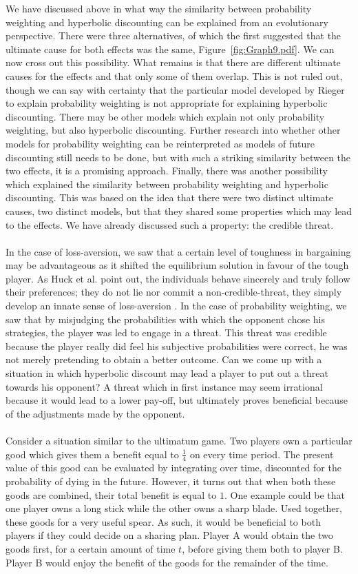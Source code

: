 \documentclass[a4paper,10pt]{article}
\numberwithin{equation}{section}
\begin{document}
We have discussed above in what way the similarity between probability weighting and hyperbolic discounting can be explained from an evolutionary perspective. There were three alternatives, of which the first suggested that the ultimate cause for both effects was the same, Figure~\ref{fig:Graph9.pdf}. We can now cross out this possibility. What remains is that there are different ultimate causes for the effects and that only some of them overlap. This is not ruled out, though we can say with certainty that the particular model developed by Rieger to explain probability weighting is not appropriate for explaining hyperbolic discounting. There may be other models which explain not only probability weighting, but also hyperbolic discounting. Further research into whether other models for probability weighting can be reinterpreted as models of future discounting still needs to be done, but with such a striking similarity between the two effects, it is a promising approach. Finally, there was another possibility which explained the similarity between probability weighting and hyperbolic discounting. This was based on the idea that there were two distinct ultimate causes, two distinct models, but that they shared some properties which may lead to the effects. We have already discussed such a property: the credible threat.\\
\\
In the case of loss-aversion, we saw that a certain level of toughness in bargaining may be advantageous as it shifted the equilibrium solution in favour of the tough player. As Huck et al. point out, the individuals behave sincerely and truly follow their preferences; they do not lie nor commit a non-credible-threat, they simply develop an innate sense of loss-aversion 
\cite{Huck2005}. In the case of probability weighting, we saw that by misjudging the probabilities with which the opponent chose his strategies, the player was led to engage in a threat. This threat was credible because the player really did feel his subjective probabilities were correct, he was not merely pretending to obtain a better outcome. Can we come up with a situation in which hyperbolic discount may lead a player to put out a threat towards his opponent? A threat which in first instance may seem irrational because it would lead to a lower pay-off, but ultimately proves beneficial because of the adjustments made by the opponent.\\
\\
Consider a situation similar to the ultimatum game. Two players own a particular good which gives them a benefit equal to $\frac{1}{4}$ on every time period. The present value of this good can be evaluated by integrating over time, discounted for the probability of dying in the future. However, it turns out that when both these goods are combined, their total benefit is equal to $1$. One example could be that one player owns a long stick while the other owns a sharp blade. Used together, these goods for a very useful spear. As such, it would be beneficial to both players if they could decide on a sharing plan. Player A would obtain the two goods first, for a certain amount of time $t$, before giving them both to player B. Player B would enjoy the benefit of the goods for the remainder of the time.
\end{document}
